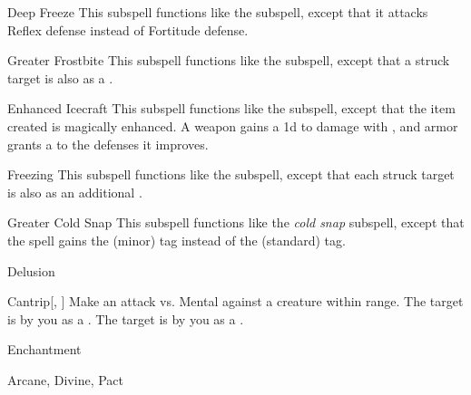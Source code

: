 \begin{ability}[\nth{3}]{Deep Freeze}
This subspell functions like the  subspell, except that it attacks Reflex defense instead of Fortitude defense.
\end{ability}
\vspace{0.25em}



\begin{ability}[\nth{3}]{Greater Frostbite}
This subspell functions like the  subspell, except that a struck target is also  as a .
\end{ability}
\vspace{0.25em}



\begin{ability}[\nth{4}]{Enhanced Icecraft}
This subspell functions like the  subspell, except that the item created is magically enhanced.
A weapon gains a \plus1d  to damage with , and armor grants a   to the defenses it improves.
\end{ability}
\vspace{0.25em}



\begin{ability}[\nth{4}]{Freezing}
This subspell functions like the  subspell, except that each struck target is also  as an additional .
\end{ability}
\vspace{0.25em}



\begin{ability}[\nth{4}]{Greater Cold Snap}
This subspell functions like the \textit{cold snap} subspell, except that the spell gains the  (minor) tag instead of the  (standard) tag.
\end{ability}
\vspace{0.25em}


\newpage
\begin{spellsection}{Delusion}

\begin{spellheader}
\end{spellheader}


\begin{ability}{Cantrip}[, ]
Make an attack vs. Mental against a creature within \rngmed range.
\hit The target is  by you as a .
\crit The target is  by you as a .
\end{ability}




 Enchantment

 Arcane, Divine, Pact
\end{spellsection}


